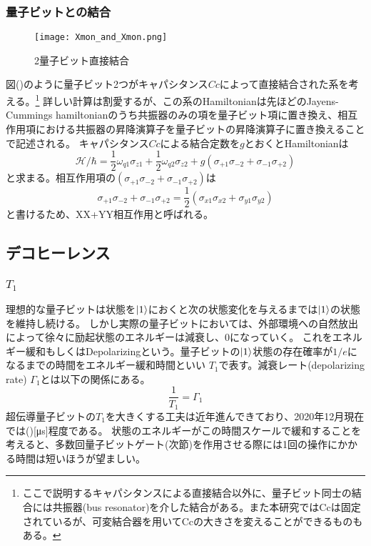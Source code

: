         \subsubsection{量子ビットとの結合}
        \begin{figure}[H]
            \begin{center}
                \texttt{[image: Xmon\_and\_Xmon.png]}
                \caption{2量子ビット直接結合}
            \end{center}
        \end{figure}
        図()のように量子ビット2つがキャパシタンス$Cc$によって直接結合された系を考える。\footnote{ここで説明するキャパシタンスによる直接結合以外に、量子ビット同士の結合には共振器(bus resonator)を介した結合がある。また本研究ではCcは固定されているが、可変結合器を用いてCcの大きさを変えることができるものもある。}
        詳しい計算は割愛するが、この系のHamiltonianは先ほどのJayens-Cummings hamiltonianのうち共振器のみの項を量子ビット項に置き換え、相互作用項における共振器の昇降演算子を量子ビットの昇降演算子に置き換えることで記述される。
        キャパシタンス$Cc$による結合定数を$g$とおくとHamiltonianは
        \begin{equation}
            \mathcal{H}/\hbar = \frac{1}{2} \omega_{q1} \sigma_{z1} +\frac{1}{2} \omega_{q2} \sigma_{z2} + g(\sigma_{+1}\sigma_{-2} + \sigma_{-1}\sigma_{+2})
        \end{equation}
        と求まる。相互作用項の$(\sigma_{+1}\sigma_{-2} + \sigma_{-1}\sigma_{+2})$は
        \begin{equation}
            \sigma_{+1}\sigma_{-2} + \sigma_{-1}\sigma_{+2} = \frac{1}{2}(\sigma_{x1}\sigma_{x2} + \sigma_{y1}\sigma_{y2})
        \end{equation}
        と書けるため、XX+YY相互作用と呼ばれる。

    \subsection{デコヒーレンス}
        \subsubsection{$T_1$}
        理想的な量子ビットは状態を$\ket{1}$におくと次の状態変化を与えるまでは$\ket{1}$の状態を維持し続ける。
        しかし実際の量子ビットにおいては、外部環境への自然放出によって徐々に励起状態のエネルギーは減衰し、0になっていく。
        これをエネルギー緩和もしくはDepolarizingという。量子ビットの$\ket{1}$状態の存在確率が$1/e$になるまでの時間をエネルギー緩和時間といい
        $T_1$で表す。減衰レート(depolarizing rate) $\Gamma_{1}$とは以下の関係にある。
        \begin{equation}
            \frac{1}{T_1} = \Gamma_{1}
        \end{equation}
        超伝導量子ビットの$T_1$を大きくする工夫は近年進んできており、2020年12月現在では()[μs]程度である。
        状態のエネルギーがこの時間スケールで緩和することを考えると、多数回量子ビットゲート(次節)を作用させる際には1回の操作にかかる時間は短いほうが望ましい。

